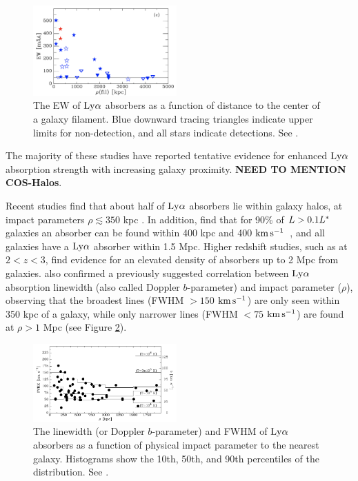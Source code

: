 \documentclass[twocolumn,tighten]{aastex62}
\newcommand{\kms}{$\rm km\, s^{-1}$}
\begin{document}
\begin{figure}[ht!]
        \centering
        \vspace{0pt}
        \includegraphics[width=0.49\textwidth]{Wakker2015_filament_EW.png}
        \caption{\small{The EW of $\rm Ly\alpha$ absorbers as a function of distance to the center of a galaxy filament. Blue downward tracing triangles indicate upper limits for non-detection, and all stars indicate detections. See \cite{wakker2015}.}}
        \vspace{5pt}
        \label{wakker_filament}
\end{figure}

The majority of these studies have reported tentative evidence for enhanced $\rm Ly\alpha$ absorption strength with increasing galaxy proximity. \textbf{NEED TO MENTION COS-Halos}.


Recent studies find that about half of $\rm Ly\alpha$ absorbers lie within galaxy halos, at impact parameters $\rho \lesssim 350$ kpc \citep{cote2005, prochaska2006}. In addition, \cite{wakker2009} find that for 90\% of $L > 0.1 L^{\**}$ galaxies an absorber can be found within 400 kpc and 400 \kms~, and all galaxies have a $\rm Ly\alpha$ absorber within 1.5 Mpc. Higher redshift studies, such as \cite{rudie2012a} at $2 < z < 3$, find evidence for an elevated density of absorbers up to 2 Mpc from galaxies. \cite{wakker2009} also confirmed a previously suggested correlation between $\rm Ly\alpha$ absorption linewidth (also called Doppler $b$-parameter) and impact parameter ($\rho$), observing that the broadest lines (FWHM $>150$ \kms) are only seen within 350 kpc of a galaxy, while only narrower lines (FWHM $<75$ \kms) are found at $\rho > 1$ Mpc (see Figure \ref{wakker2009_linewidth}).


\begin{figure}[ht!]
        \centering
        \vspace{0pt}
        \includegraphics[width=0.49\textwidth]{bart_moneyplot.png}
        \caption{\small{The linewidth (or Doppler $b$-parameter) and FWHM of $\rm Ly\alpha$ absorbers as a function of physical impact parameter to the nearest galaxy. Histograms show the 10th, 50th, and 90th percentiles of the distribution.  See \cite{wakker2009}.}}
        \vspace{5pt}
        \label{wakker2009_linewidth}
\end{figure}
\end{document}
